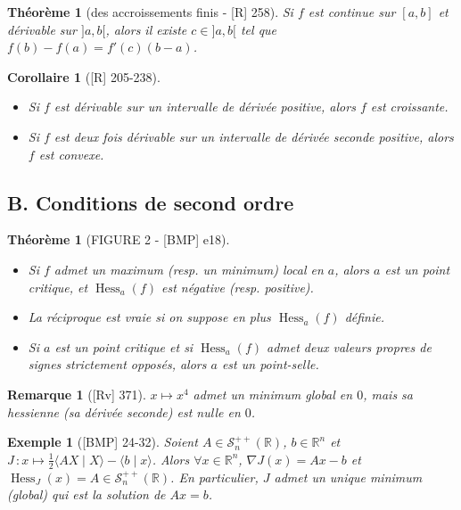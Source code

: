 \documentclass[10pt, a4paper, parskip=full, twoside, twocolumn]{report}
\newtheorem{theorem}[definition]{Théorème}
\newtheorem{corollary}[definition]{Corollaire}
\newtheorem{example}[definition]{Exemple}
\newtheorem{remark}[definition]{Remarque}
\newcommand{\IR}{\mathbb{R}}
\DeclareMathOperator{\Hess}{Hess}
\begin{document}
\begin{theorem}[des accroissements finis - \textnormal{[R] 258}]
	Si $f$ est continue sur $[a,b]$ et dérivable sur $]a,b[$, alors il existe $c\in ]a,b[$ tel que $f(b)-f(a) = f'(c)(b-a)$.
\end{theorem}

\begin{corollary}[\textnormal{[R] 205-238}]
	\begin{itemize}
		\item Si $f$ est dérivable sur un intervalle de dérivée positive, alors $f$ est croissante.
		\item Si $f$ est deux fois dérivable sur un intervalle de dérivée seconde positive, alors $f$ est convexe.
	\end{itemize}
\end{corollary}

\subsection*{B. Conditions de second ordre}
\begin{theorem}[FIGURE 2 - \textnormal{[BMP] e18}]
	\begin{itemize}
		\item Si $f$ admet un maximum (resp. un minimum) local en $a$, alors $a$ est un point critique, et $\Hess_a(f)$ est négative (resp. positive).
		\item La réciproque est vraie si on suppose en plus $\Hess_a(f)$ définie.
		\item Si $a$ est un point critique et si $\Hess_a(f)$ admet deux valeurs propres de signes strictement opposés, alors $a$ est un \emph{point-selle}.
	\end{itemize}
\end{theorem}

\begin{remark}[\textnormal{[Rv] 371}]
	$x\mapsto x^4$ admet un minimum global en $0$, mais sa hessienne (sa dérivée seconde) est nulle en $0$.
\end{remark}


\begin{example}[\textnormal{[BMP] 24-32}]
	Soient $A\in\mathcal{S}_n^{++}(\IR)$, $b\in\IR^n$ et $J\,\colon x\mapsto \frac{1}{2}\langle AX\mid X\rangle - \langle b\mid x\rangle$.
	Alors $\forall x\in \IR^n$, $\nabla J(x)=Ax-b$ et $\Hess_J(x) = A\in\mathcal{S}_n^{++}(\IR)$.
	En particulier, $J$ admet un unique minimum (global) qui est la solution de $Ax= b$.
\end{example}
\end{document}
